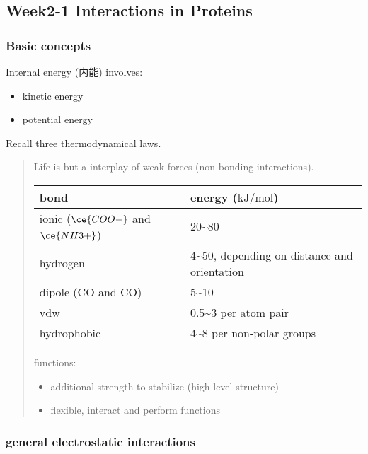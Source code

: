 \documentclass[]{article}
\begin{document}
\hypertarget{week2-1-interactions-in-proteins}{%
\subsection{Week2-1 Interactions in
Proteins}\label{week2-1-interactions-in-proteins}}

\hypertarget{basic-concepts}{%
\subsubsection{Basic concepts}\label{basic-concepts}}

Internal energy (内能) involves:

\begin{itemize}
\item
  kinetic energy
\item
  potential energy
\end{itemize}

Recall three thermodynamical laws.

\begin{quote}
Life is but a interplay of weak forces (non-bonding interactions).

\begin{longtable}[]{@{}ll@{}}
\toprule
bond & energy (\(\mathrm{kJ/mol}\))\tabularnewline
\midrule
\endhead
ionic (\(\ce{COO-}\) and \(\ce{NH3+}\)) &
20\textasciitilde{}80\tabularnewline
hydrogen & 4\textasciitilde{}50, depending on distance and
orientation\tabularnewline
dipole (CO and CO) & 5\textasciitilde{}10\tabularnewline
vdw & 0.5\textasciitilde{}3 per atom pair\tabularnewline
hydrophobic & 4\textasciitilde{}8 per non-polar groups\tabularnewline
\bottomrule
\end{longtable}

functions:

\begin{itemize}
\item
  additional strength to stabilize (high level structure)
\item
  flexible, interact and perform functions
\end{itemize}
\end{quote}

\hypertarget{general-electrostatic-interactions}{%
\subsubsection{general electrostatic
interactions}\label{general-electrostatic-interactions}}
\end{document}
